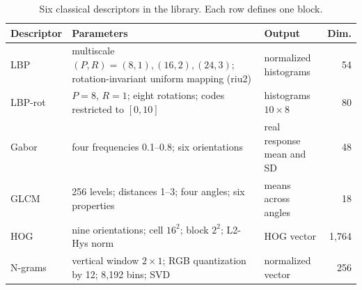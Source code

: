 \documentclass[10pt,a4paper,fleqn]{article}
\begin{document}
\begin{table}[htbp]
\centering
\caption{Six classical descriptors in the library. Each row defines one block.}
\label{tab:extractores-clasicos}
\begin{tabular}{@{}lp{5.1cm}p{2.3cm}r@{}}
\toprule
Descriptor & Parameters & Output & Dim. \\
\midrule
LBP & multiscale $(P,R)=(8,1),(16,2),(24,3)$; rotation-invariant uniform mapping (riu2) & normalized histograms & 54 \\
LBP-rot & $P=8$, $R=1$; eight rotations; codes restricted to $[0,10]$ & histograms $10\times 8$ & 80 \\
Gabor & four frequencies 0.1--0.8; six orientations & real response mean and SD & 48 \\
GLCM & 256 levels; distances 1--3; four angles; six properties & means across angles & 18 \\
HOG & nine orientations; cell $16^2$; block $2^2$; L2-Hys norm & HOG vector & 1,764 \\
N-grams & vertical window $2\times1$; RGB quantization by 12; 8,192 bins; SVD & normalized vector & 256 \\
\bottomrule
\end{tabular}
\end{table}
\end{document}

